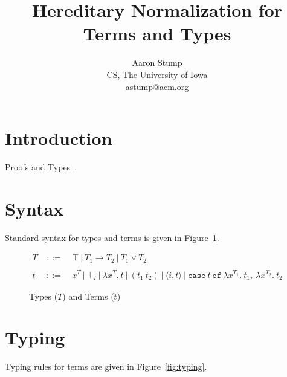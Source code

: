 \documentclass{article}
\begin{document}
\title{Hereditary Normalization for Terms and Types}

\author{Aaron Stump \\
CS, The University of Iowa \\
\url{astump@acm.org}}


\maketitle


\begin{abstract}
\end{abstract}

\section{Introduction}

Proofs and Types~\cite{pat}.

\section{Syntax}

Standard syntax for types and terms is given in
Figure~\ref{fig:syntax}.

\begin{figure}
\begin{eqnarray*}
T & \ ::=\ & \top\ |\ T_1 \to T_2\ |\ T_1 \vee T_2 \\ \\
t & \ ::=\ & x^T\ |\ \top_I\ |\ \lambda x^T.\ t\ |\ (t_1\ t_2)\ |\ \langle i, t \rangle\ |\ \texttt{case}\ t\ \texttt{of}\ \lambda x^{T_1}.\ t_1,\ \lambda x^{T_2}. \ t_2
\end{eqnarray*}
\caption{\label{fig:syntax}Types ($T$) and Terms ($t$)}
\end{figure}

\section{Typing}

Typing rules for terms are given in Figure~\ref{fig:typing}.
\end{document}

